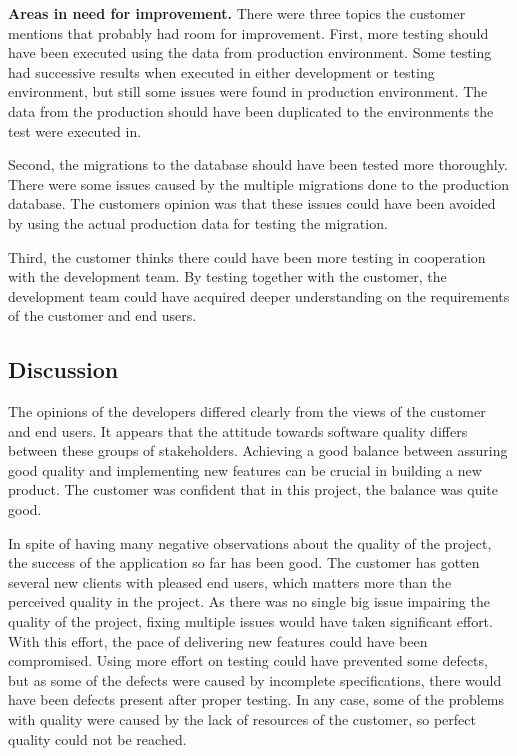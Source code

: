 \textbf{Areas in need for improvement.} There were three topics the customer mentions that probably had room for improvement. First, more testing should have been executed using the data from production environment. Some testing had successive results when executed in either development or testing environment, but still some issues were found in production environment. The data from the production should have been duplicated to the environments the test were executed in.

Second, the migrations to the database should have been tested more thoroughly. There were some issues caused by the multiple migrations done to the production database. The customers opinion was that these issues could have been avoided by using the actual production data for testing the migration.

Third, the customer thinks there could have been more testing in cooperation with the development team. By testing together with the customer, the development team could have acquired deeper understanding on the requirements of the customer and end users.


\subsection{Discussion}


The opinions of the developers differed clearly from the views of the customer and end users. It appears that the attitude towards software quality differs between these groups of stakeholders. Achieving a good balance between assuring good quality and implementing new features can be crucial in building a new product. The customer was confident that in this project, the balance was quite good. 

In spite of having many negative observations about the quality of the project, the success of the application so far has been good. The customer has gotten several new clients with pleased end users, which matters more than the perceived quality in the project. As there was no single big issue impairing the quality of the project, fixing multiple issues would have taken significant effort. With this effort, the pace of delivering new features could have been compromised. Using more effort on testing could have prevented some defects, but as some of the defects were caused by incomplete specifications, there would have been defects present after proper testing. In any case, some of the problems with quality were caused by the lack of resources of the customer, so perfect quality could not be reached.

